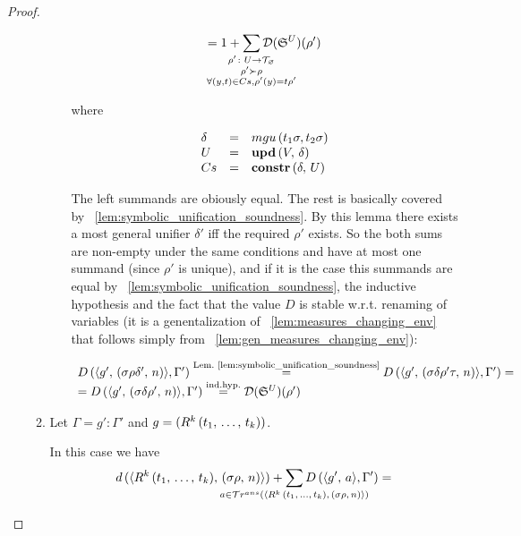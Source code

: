 \begin{proof}
\begin{enumerate}
\begin{enumerate}
\begin{enumerate}
	\[ = 1 +
      \smashoperator{\sum\limits_{\substack{ \rho' \colon U \to \grterms \\
                                      \rho' \succ \rho \\
                                      \forall (y, t) \in Cs, \rho'(y) = t \rho'  }}}
           \mathcal{D}(\schemewithvset{\mathfrak{S}}{U})(\rho')  \]
           
    		where
    
    \[ \begin{array}{lcl}
    \delta & = & mgu\,(t_1 \sigma, t_2 \sigma) \\
    U & = & \mbox{\textbf{upd}}\,(V,\, \delta) \\
    Cs & = & \mbox{\textbf{constr}}\,(\delta,\, U) \\
	\end{array} \]
	
			The left summands are obiously equal. The rest is basically covered by \lemmaword~\ref{lem:symbolic_unification_soundness}. By this lemma there exists a most general unifier $\delta'$ iff the required $\rho'$ exists. So the both sums are non-empty under the same conditions and have at most one summand (since $\rho'$ is unique), and if it is the case this summands are equal by \lemmaword~\ref{lem:symbolic_unification_soundness}, the inductive hypothesis and the fact that the value $D$ is stable w.r.t. renaming of variables (it is a genentalization of \lemmaword~\ref{lem:measures_changing_env} that follows simply from \lemmaword~\ref{lem:gen_measures_changing_env}):
	
\[ \begin{array}{l}
D\,(\langle g' ,\, (\sigma \rho \delta' ,\, n) \rangle, \Gamma') \stackrel{\text{Lem.~\ref{lem:symbolic_unification_soundness}}}{=} D\,(\langle g' ,\, (\sigma \delta \rho' \tau ,\, n) \rangle, \Gamma') = \\
= D\,(\langle g' ,\, (\sigma \delta \rho' ,\, n) \rangle, \Gamma') \stackrel{\text{ind.hyp.}}{=} \mathcal{D}({\mathfrak{S}}^{U})(\rho')
\end{array} \] 

	\end{enumerate}
	
	\item Let $\Gamma = g' : \Gamma'$ and $g = (R^k\,(t_1, \, \dots, \, t_k))$.
	
	In this case we have \[ d\,(\taskst{\invokegoal{R^k}{t_1}{t_k}}{\mkenv{\sigma\rho}{n}}) + \smashoperator{\sum\limits_{a \in \tra{\taskst{\invokegoal{R^k}{t_1}{t_k}}{\mkenv{\sigma\rho}{n}}}}} D\,(\taskst{g'}{a}, \Gamma') = \]
	

\end{enumerate}
\end{enumerate}
\end{proof}
